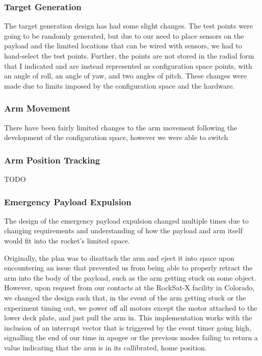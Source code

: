\subsubsection{Target Generation}
The target generation design has had some slight changes. The test points were going to be 
randomly generated, but due to our need to place sensors on the payload and the limited locations
that can be wired with sensors, we had to hand-select the test points. Further, the points are 
not stored in the radial form that I indicated and are instead represented as configuration space
 points, with an angle of roll, an angle of yaw, and two angles of pitch. These changes were made
due to limits imposed by the configuration space and the hardware.

\subsubsection{Arm Movement}
There have been fairly limited changes to the arm movement following the development of the 
configuration space, however we were able to switch

\subsubsection{Arm Position Tracking}
TODO

\subsubsection{Emergency Payload Expulsion}
The design of the emergency payload expulsion changed multiple times due to
changing requirements and understanding of how the \gls{payload} and arm itself would fit into the rocket's limited space.

Originally, the plan was to disattach the arm and eject it into space upon
encountering an issue that prevented us from being able to properly retract the arm into the body of the payload,
such as the arm getting stuck on some object. However, upon request from our contacts at the RockSat-X facility in 
Colorado, we changed the design such that, in the event of the arm getting stuck or the experiment timing out, 
we power off all motors except the motor attached to the lower deck plate, and just pull the arm in. This
implementation works with the inclusion of an interrupt vector that is triggered by the event timer
going high, signalling the end of our time in apogee or the previous modes failing to return a value indicating
that the arm is in its callibrated, home position.

